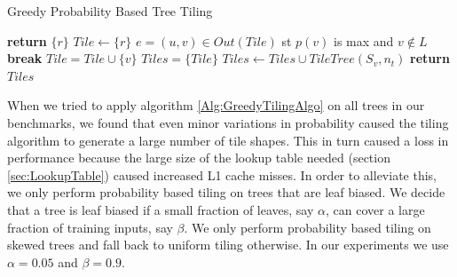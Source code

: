 \begin{algorithm}
    \caption{Greedy Probability Based Tree Tiling}
    \label{Alg:GreedyTilingAlgo}
    \begin{algorithmic}
                \State \textbf{return} $\{ r \}$
            \EndIf
            \State $Tile \leftarrow \{ r \}$
                \State $e = (u,v) \in Out(Tile)$ st $p(v)$ is max and $v \notin L$
                    \State \textbf{break}
                \EndIf
                \State $Tile = Tile \cup \{ v \}$
            \EndWhile
            \State $Tiles =  \{ Tile \}$
                \State $Tiles \leftarrow Tiles \cup TileTree(S_v, n_t)$
            \EndFor
            \State \textbf{return} $Tiles$
        \EndProcedure
    \end{algorithmic}
\end{algorithm}

When we tried to apply algorithm \ref{Alg:GreedyTilingAlgo} on all trees in our benchmarks, we found
that even minor variations in probability caused the tiling algorithm to generate a large 
number of tile shapes. This in turn caused a loss in performance because the large size of the 
lookup table needed (section \ref{sec:LookupTable}) caused increased L1 cache misses. In order to 
alleviate this, we only perform probability based tiling on trees that are leaf biased. We decide that 
a tree is leaf biased if a small fraction of leaves, say $\alpha$, can cover a large fraction of training inputs, say $\beta$.
We only perform probability based tiling on skewed trees and fall back to uniform tiling otherwise. 
In our experiments we use $\alpha=0.05$ and $\beta=0.9$. 


